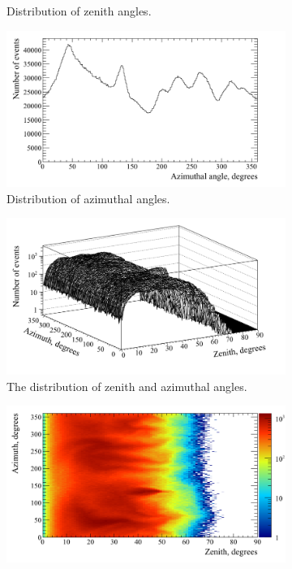 \begin{figure}[h!]
\begin{subfigure}{0.45\textwidth}
    \caption{Distribution of zenith angles.}
  \end{subfigure}
  \hspace{0.08\textwidth}
  \begin{subfigure}{0.45\textwidth}
    \centering
    \includegraphics[width=\textwidth]{AzimuthCan}
    \caption{Distribution of azimuthal angles.}
  \end{subfigure}
  \begin{subfigure}{0.45\textwidth}
    \centering
    \includegraphics[width=\textwidth]{AziZenCan}
    \caption{The distribution of zenith and azimuthal angles.}
  \end{subfigure}
  \hspace{0.08\textwidth}
  \begin{subfigure}{0.45\textwidth}
    \centering
    \includegraphics[width=\textwidth]{AziZenColzCan}

\end{subfigure}
\end{figure}
